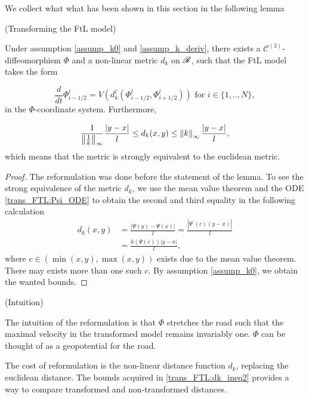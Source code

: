 We collect what what has been shown in this section in the following lemma

\begin{lemma}(Transforming the FtL model) \label{lem:trans_FTL}
	
	Under assumption \eqref{assump_k0} and \eqref{assump_k_deriv}, there exists a $\mathscr{C}^{(3)}$-diffeomorphism $\Phi$ and a non-linear metric $d_k$ on $\mathscr{R}$, such that the FtL model takes the form 
	
	\begin{equation}\label{trans_FTL:FtL_transformed2}  
		\frac{d}{dt} \Phi^l_{i-1/2}  = V\left(d_k^l(\Phi^l_{i-1/2}, \Phi^l_{i+1/2})\right) \text{ for } i \in \{1,..,N\},
	\end{equation}
	in the $\Phi$-coordinate system. Furthermore, 
	
	\begin{equation} \label{trans_FTL:dk_ineq2}
		\frac{1}{\left\lVert\frac{1}{k}\right\rVert_\infty} \frac{\left| y - x\right|}{l} \leq d_k(x,y)  \leq  \left\lVert k\right\rVert_\infty \frac{\left| y - x\right|}{l},
	\end{equation}
	which means that the metric is strongly equivalent to the euclidean metric. 
\end{lemma}

\begin{proof}
	The reformulation was done before the statement of the lemma. To see the strong equivalence of the metric $d_k$, we use the mean value theorem and the ODE \eqref{trans_FTL:Psi_ODE} to obtain the second and third equality in the following calculation
	\begin{align}
		d_k(x,y) &= \frac{|\Psi(y) - \Psi(x)|}{l} = \frac{\left|\Psi^{'}(c) \left(y - x\right)\right|}{l} \\
		&=\frac{k(\Psi(c)) \left| y - x \right|}{l},
	\end{align} 
	where $c \in (\min(x,y),\max(x,y))$ exists due to the mean value theorem. There may exists more than one such $c$. By assumption \eqref{assump_k0}, we obtain the wanted bounds.
\end{proof}

\begin{remark}(Intuition)
	
	The intuition of the reformulation is that $\Phi$ stretches the road such that the maximal velocity in the transformed model remains invariably one. $\Phi$ can be thought of as a geopotential for the road.
	
	The cost of reformulation is the non-linear distance function $d_k$, replacing the euclidean distance. The bounds acquired in \eqref{trans_FTL:dk_ineq2} provides a way to compare transformed and non-transformed distances.
\end{remark}

